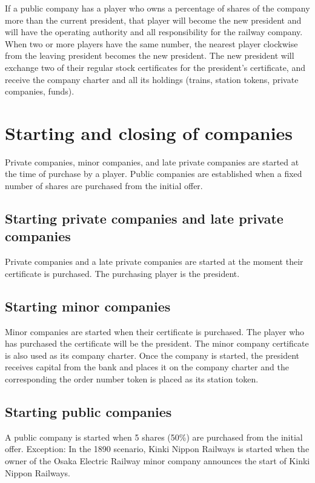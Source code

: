 \documentclass{article}
\begin{document}
\begin{CJK}{UTF8}{min}
\begin{multicols}{2}
If a public company has a player who owns a percentage of shares of
the company more than the current president, that player will become
the new president and will have the operating authority and all
responsibility for the railway company. When two or more players have
the same number, the nearest player clockwise from the leaving
president becomes the new president. The new president will exchange
two of their regular stock certificates for the president's
certificate, and receive the company charter and all its holdings
(trains, station tokens, private companies, funds).


\section{Starting and closing of companies}
Private companies, minor companies, and late private companies are
started at the time of purchase by a player. Public companies are
established when a fixed number of shares are purchased from the
initial offer.

\subsection{Starting private companies and late private companies}
Private companies and a late private companies are started at the
moment their certificate is purchased. The purchasing player is the
president.

\subsection{Starting minor companies}
Minor companies are started when their certificate is
purchased. The player who has purchased the certificate will be the
president. The minor company certificate is also used as its company
charter. Once the company is started, the
president receives capital from the bank and places it on the company
charter and the corresponding the order number token is placed as its
station token.

\subsection{Starting public companies}
A public company is started when 5 shares (50\%) are purchased from
the initial offer. Exception: In the 1890 scenario, Kinki Nippon
Railways is started when the owner of the Osaka Electric Railway minor
company announces the start of Kinki Nippon Railways.


\end{multicols}
\end{CJK}
\end{document}
